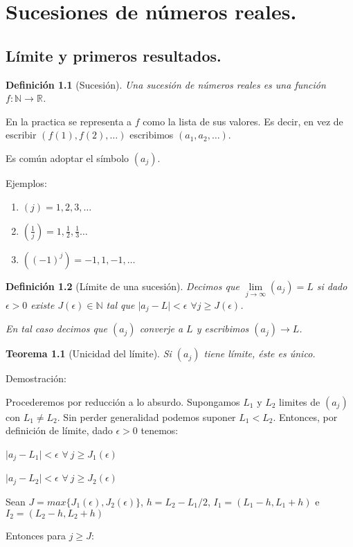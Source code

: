 \documentclass[12pt]{book}
\newcommand\R{{\mathbb R}}
\newcommand\N{{\mathbb N}}
\providecommand{\abs}[1]{\lvert#1\rvert}
\newtheorem{teo}{Teorema}[section]
\newtheorem{defi}{Definición}[section]
\begin{document}
\chapter{Sucesiones de números reales.}
\section{Límite y primeros resultados.}
\begin{defi}[Sucesión]\rm
Una sucesión de números reales es una función $f:\N \rightarrow \R$.
\end{defi}
En la practica se representa a $f$ como la lista de sus valores. Es decir, en vez de escribir $(f(1),f(2),\dots)$ escribimos $(a_{1},a_{2},\dots)$.

Es común adoptar el símbolo $(a_{j})$.

Ejemplos:
\begin{enumerate}
\item $(j)=1,2,3,\dots$
\item $(\frac{1}{j})=1,\frac{1}{2},\frac{1}{3}\dots$
\item $((-1)^j)=-1,1,-1,\dots$
\end{enumerate}
\begin{defi}[Límite de una sucesión]\rm
Decimos que $\lim\limits_{j\to\infty}(a_{j})=L$ si dado $\epsilon>0$ existe $J(\epsilon)\in\N$ tal que $\abs{a_{j}-L}<\epsilon$ $\forall{j \ge J(\epsilon)}$.

En tal caso decimos que $(a_{j})$ converje a $L$ y escribimos $(a_{j})\rightarrow L$.
\end{defi}

\begin{teo}[Unicidad del límite]\rm
Si $(a_{j})$ tiene límite, éste es único.
\end{teo}
Demostración:

Procederemos por reducción a lo absurdo. Supongamos $L_1 \mbox{ y }L_2$ limites de $(a_j)$ con $L_1 \neq L_2$. Sin perder generalidad podemos suponer $L_1<L_2$. Entonces, por definición de límite, dado $\epsilon>0$ tenemos:

$\abs{a_j-L_1}<\epsilon$ $\forall \ j\ge J_1(\epsilon)$

$\abs{a_j-L_2}<\epsilon$ $\forall \ j\ge J_2(\epsilon)$

Sean $J=max\{J_1(\epsilon),J_2(\epsilon)\}$, $h=L_2-L_1/2$, $I_1=(L_1-h,L_1+h)$ e $I_2=(L_2-h,L_2+h)$

Entonces para $j \ge J$:
\end{document}
